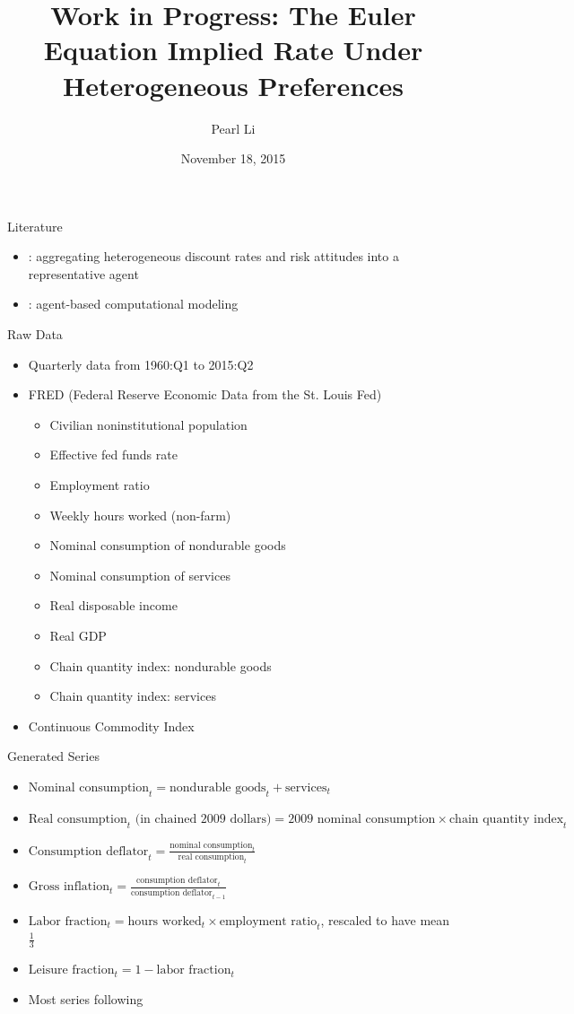 \documentclass{beamer}
\title[Euler Equations]{Work in Progress: The Euler Equation Implied Rate Under Heterogeneous Preferences}
\author[Li]{Pearl Li}
\date{November 18, 2015}
\begin{document}
\begin{frame}
\titlepage
\end{frame}


\begin{frame}{Literature}
\begin{itemize}
\item \cite{hara09}: aggregating heterogeneous discount rates and risk attitudes into a representative agent
\item \cite{tesfatsion05}: agent-based computational modeling
\end{itemize}
\end{frame}

\begin{frame}{Raw Data}
\begin{itemize}
\item Quarterly data from 1960:Q1 to 2015:Q2 \bigskip\bigskip
\item FRED (Federal Reserve Economic Data from the St. Louis Fed)
  \begin{itemize}
  \item Civilian noninstitutional population
  \item Effective fed funds rate
  \item Employment ratio
  \item Weekly hours worked (non-farm)
  \item Nominal consumption of nondurable goods
  \item Nominal consumption of services
  \item Real disposable income
  \item Real GDP
  \item Chain quantity index: nondurable goods
  \item Chain quantity index: services
  \end{itemize}
\item Continuous Commodity Index
\end{itemize}
\end{frame}

\begin{frame}{Generated Series}
\begin{itemize}
\item $\text{Nominal consumption}_t = \text{nondurable goods}_t + \text{services}_t$
\item $\text{Real consumption}_t \text{ (in chained 2009 dollars)} = \text{2009 nominal consumption} \times \text{chain quantity index}_t$
\item $\text{Consumption deflator}_t = \frac{\text{nominal consumption}_t}{\text{real consumption}_t}$
\item $\text{Gross inflation}_t = \frac{\text{consumption deflator}_t}{\text{consumption deflator}_{t-1}}$
\item $\text{Labor fraction}_t = \text{hours worked}_t \times \text{employment ratio}_t$, rescaled to have mean $\frac{1}{3}$
\item $\text{Leisure fraction}_t = 1 - \text{labor fraction}_t$ \bigskip\bigskip
\item Most series following \cite{collard11}
\end{itemize}
\end{frame}
\end{document}
